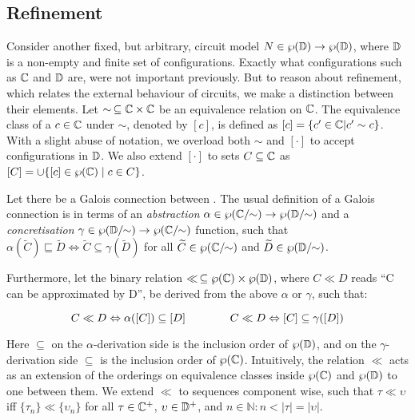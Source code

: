 \subsection{Refinement}

Consider another fixed, but arbitrary, circuit model $N \in \wp(\mathbb{D}) \rightarrow \wp(\mathbb{D})$, where $\mathbb{D}$ is a non-empty and finite set of configurations. Exactly what configurations such as $\mathbb{C}$ and $\mathbb{D}$ are, were not important previously. But to reason about refinement, which relates the external behaviour of circuits, we make a distinction between their elements. Let $\sim \, \subseteq \mathbb{C} \times \mathbb{C}$ be an equivalence relation on $\mathbb{C}$. The equivalence class of a $c \in \mathbb{C}$ under $\sim$, denoted by $[c]$, is defined as $[c] = \{ c' \in \mathbb{C} | c' \sim c \}$. With a slight abuse of notation, we overload both $\sim$ and $[\cdot]$ to accept configurations in $\mathbb{D}$. We also extend $[\cdot]$ to sets $C \subseteq \mathbb{C}$ as $[C] = \cup\{[c] \in \wp(\mathbb{C}) \mid c \in C \}$.


Let there be a Galois connection between . The usual definition of a Galois connection is in terms of an \textit{abstraction} $\alpha \in \wp(\mathbb{C}/\mkern-6mu\sim) \rightarrow \wp(\mathbb{D}/\mkern-6mu\sim)$ and a \textit{concretisation} $\gamma \in \wp(\mathbb{D}/\mkern-6mu\sim) \rightarrow \wp(\mathbb{C}/\mkern-6mu\sim)$ function, such that $\alpha(\widetilde{C}) \sqsubseteq \widetilde{D} \iff \widetilde{C} \subseteq \gamma(\widetilde{D})$ for all $\widetilde{C} \in \wp(\mathbb{C}/\mkern-6mu\sim)$ and $\widetilde{D} \in \wp(\mathbb{D}/\mkern-6mu\sim)$. 

Furthermore, let the binary relation $\ll \, \subseteq \wp(\mathbb{C}) \times \wp(\mathbb{D})$, where $C \ll D$ reads ``C can be approximated by D'', be derived from the above $\alpha$ or $\gamma$, such that:

\begin{equation*}
C \ll D \Leftrightarrow \alpha([C]) \subseteq [D] \quad\quad\quad\quad C \ll D \Leftrightarrow [C] \subseteq \gamma([D])
\end{equation*}

\noindent Here $\subseteq$ on the $\alpha$-derivation side is the inclusion order of $\wp(\mathbb{D})$, and on the $\gamma$-derivation side $\subseteq$ is the inclusion order of $\wp(\mathbb{C})$. Intuitively, the relation $\ll$ acts as an extension of the orderings on equivalence classes inside $\wp(\mathbb{C})$ and $\wp(\mathbb{D})$ to one between them.  We extend $\ll$ to sequences component wise, such that $\tau \ll \upsilon$ iff $\{ \tau_{n} \} \ll \{ \upsilon_{n} \}$ for all $\tau \in \mathbb{C}^{+}$, $\upsilon \in \mathbb{D}^{+}$, and $n \in \mathbb{N} : n < | \tau | = | \upsilon |$.

